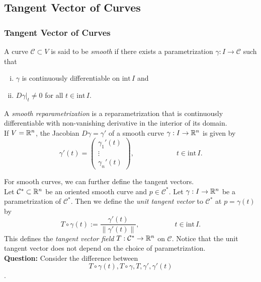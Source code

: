 \documentclass[12pt, t]{beamer}
\renewcommand{\emph}[1]{{\color{Turquoise3}\textsl{#1}}}
\newcommand{\nullspace}{~\\[15pt]}
\newcommand{\Question}{\textbf{Question: }}
\begin{document}
\subsection{Tangent Vector of Curves}
\begin{frame}[allowframebreaks]
    \frametitle{Tangent Vector of Curves}

    A curve $\mathcal{C}\subset V$ is said to be \emph{smooth} if there exists a parametrization $\gamma:I\to\mathcal{C}$ such that
    \begin{enumerate}[(i)]
        \item $\gamma$ is continuously dif{}ferentiable on $\text{int}\,I$ and
        \item $D\gamma|_t\neq0$ for all $t\in\text{int}\,I$.
    \end{enumerate}
    A \emph{smooth reparametrization} is a reparametrization that is continuously
    dif{}ferentiable with non-vanishing derivative in the interior of its domain.\\[6pt]
    If $V=\mathbb{R}^n$, the Jacobian $D\gamma=\gamma'$ of a smooth curve $\gamma:I\to\mathbb{R}^n$ is given by
    \[\gamma'(t)=\begin{pmatrix}
            \gamma_1'(t) \\
            \vdots       \\
            \gamma_n'(t)
        \end{pmatrix},\qquad\qquad\qquad
        t\in\text{int}\,I.\]

    For smooth curves, we can further define the tangent vectors.\nullspace

    Let $\mathcal{C}^*\subset\mathbb{R}^n$ be an oriented smooth curve and $p\in\mathcal{C}^*$. Let $\gamma:I\to\mathbb{R}^n$ be a parametrization of $\mathcal{C}^*$. Then we define the \emph{unit tangent vector} to $\mathcal{C}^*$ at $p=\gamma(t)$ by
    \begin{equation}\label{2.3.4}
        T\circ\gamma(t):=\frac{\gamma'(t)}{\|\gamma'(t)\|},
        \qquad\qquad\quad t\in\text{int}\,I.
    \end{equation}
    This defines the \emph{tangent vector field} $T:\mathcal{C}^*\to\mathbb{R}^n$ on $\mathcal{C}$. Notice that the unit tangent vector does not depend on the choice of parametrization.\\[5pt]

    \Question Consider the difference between $$T\circ\gamma(t),T\circ\gamma, T,\gamma',\gamma'(t)$$.
\end{frame}
\end{document}
